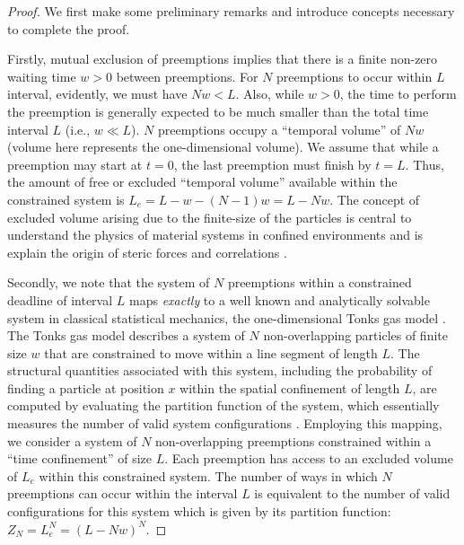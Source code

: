 \begin{proof} 
We first make some preliminary remarks and introduce concepts necessary to complete the proof. 

Firstly, mutual exclusion of preemptions implies that there is a finite non-zero waiting time $w>0$ between preemptions. 
For $N$ preemptions to occur within $L$ interval, evidently, we must have $N w < L$. Also, while $w >0$, the time to perform the preemption is generally expected to be much smaller than the total time interval $L$ (i.e., $w \ll L$).
$N$ preemptions occupy a ``temporal volume'' of $Nw$ (volume here represents the one-dimensional volume). We assume that while a preemption may start at $t=0$, the last preemption must finish by $t = L$. Thus, the amount of free or excluded ``temporal volume'' available within the constrained system is $L_e = L - w - (N-1)w = L - Nw$.
The concept of excluded volume arising due to the finite-size of the particles is central to understand the physics of material systems in confined environments and is explain the origin of steric forces and correlations \cite{krauth2006statistical,jing2015ionic,solis2013generating}. 

Secondly, we note that the system of $N$ preemptions within a constrained deadline of interval $L$ maps \emph{exactly} to a well known and analytically solvable system in classical statistical mechanics, the one-dimensional Tonks gas model \cite{tonks}. The Tonks gas model describes a system of $N$ non-overlapping particles of finite size $w$ that are constrained to move within a line segment of length $L$. The structural quantities associated with this system, including the probability of finding a particle at position $x$ within the spatial confinement of length $L$, are computed by evaluating the partition function of the system, which essentially measures the number of valid system configurations \cite{krauth2006statistical}. 
Employing this mapping, we consider a system of $N$ non-overlapping preemptions constrained within a ``time confinement'' of size $L$. Each preemption has access to an excluded volume of $L_e$ within this constrained system. 
The number of ways in which $N$ preemptions can occur within the interval $L$ is equivalent to the number of valid configurations for this system which is given by its partition function: $Z_N = L_e^N = (L- Nw)^N$.


\end{proof}
